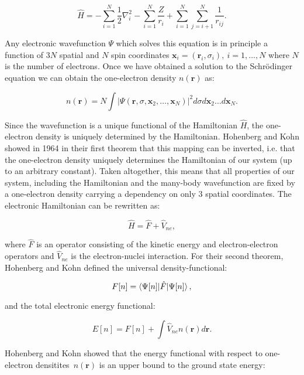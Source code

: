 \begin{equation}
    \hat{H} = -\sum_{i=1}^N \frac{1}{2} \nabla_i^2
    - \sum_{i=1}^N \frac{Z}{r_{i}} + \sum_{i=1}^N \sum_{j=i+1}^N
    \frac{1}{r_{ij}} .
\end{equation}

Any electronic wavefunction $\Psi$ which solves this equation
is in principle a function of $3N$ spatial and $N$ spin coordinates 
$\bm{x}_i = (\bm{r}_i, \sigma_i)
, \ i=1,\dots,N$
where $N$ is the number of electrons.
Once we have obtained a solution to the Schr\"{o}dinger equation
we can obtain the one-electron density $n(\bm{r})$ as:

\begin{equation}
    n(\bm{r}) = N \int \left| \Psi(\bm{r}, \sigma, \bm{x}_2,\dots,\bm{x}_N)
    \right|^2 d\sigma d\bm{x}_2 \dots d\bm{x}_N .
\end{equation}

Since the wavefunction is a unique functional of the Hamiltonian
$\hat{H}$, the one-electron density is uniquely determined
by the Hamiltonian. Hohenberg and Kohn showed in 1964
\cite{hohenberg1964inhomogeneous} in their first theorem that this mapping
can be inverted, i.e. that the one-electron density uniquely
determines the Hamiltonian of our system (up to an arbitrary constant).
Taken altogether, this means that all properties of our system, including
the Hamiltonian and the many-body wavefunction are fixed
by a one-electron density carrying a dependency on only 3 spatial coordinates.
The electronic Hamiltonian can be rewritten as:

\begin{equation}
 \hat{H} = \hat{F} + \hat{V}_{ne} , 
\end{equation}

where $\hat{F}$ is an operator consisting of the kinetic energy
and electron-electron operators and $\hat{V}_{ne}$
is the electron-nuclei interaction.
For their second theorem, Hohenberg and Kohn defined
the universal density-functional:

\begin{equation}
 F[n] = \braket{\Psi[n] | \hat{F} | \Psi[n]} , 
\end{equation}

and the total electronic energy functional:

\begin{equation}
 E[n] = F[n] + \int \hat{V}_{ne} n(\bm{r}) d\bm{r} . 
\end{equation}

Hohenberg and Kohn showed that the energy functional
with respect to one-electron densitites $n(\bm{r})$
is an upper bound to the ground state energy:

